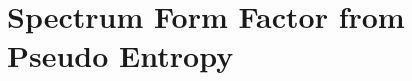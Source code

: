 \documentclass[%
twocolumn, 
secnumarabic,amssymb, preprintnumbers, superscriptaddress, aps, prl]{revtex4-1}
\begin{document}
\section{Spectrum Form Factor from Pseudo Entropy}\label{sec:PEandSSF}


\end{document}

